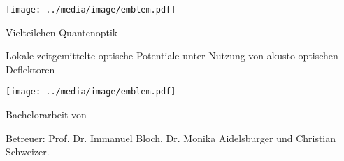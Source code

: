 \makeatletter
\begin{titlepage}
  \begin{center}
    \@subject

    \vspace{.8em}
    \huge
    \@title

    \vspace{.5em}
    \texttt{[image: ../media/image/emblem.pdf]}

    \@subtitle

    \vspace{.8em}
    \@author

    \@date

    \vspace{.8em}
    \@publishers
  \end{center}
\end{titlepage}
\makeatother

\makeatletter
\begin{titlepage}
  \begin{otherlanguage}{ngerman}
    \begin{center}
      Vielteilchen Quantenoptik

      \vspace{.8em}
      \huge
      Lokale zeitgemittelte optische Potentiale unter Nutzung von
      akusto-optischen Deflektoren

      \vspace{.5em}
      \texttt{[image: ../media/image/emblem.pdf]}

      Bachelorarbeit von

      \vspace{.6em}
      \@author

      \@date

      \vspace{.8em}
      Betreuer: Prof. Dr. Immanuel Bloch, Dr. Monika Aidelsburger und
      Christian Schweizer.
    \end{center}
  \end{otherlanguage}
\end{titlepage}
\makeatother
